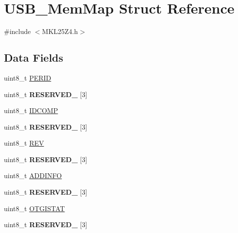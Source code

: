 \hypertarget{struct_u_s_b___mem_map}{}\section{U\+S\+B\+\_\+\+Mem\+Map Struct Reference}
\label{struct_u_s_b___mem_map}


{\ttfamily \#include $<$M\+K\+L25\+Z4.\+h$>$}

\subsection*{Data Fields}
\begin{DoxyCompactItemize}
\item 
uint8\+\_\+t \hyperlink{struct_u_s_b___mem_map_af90a61467080255b062e7a3ed7179e3a}{P\+E\+R\+I\+D}
\item 
\hypertarget{struct_u_s_b___mem_map_a6d02c9345b2d39c945c905d46077a0ec}{}uint8\+\_\+t {\bfseries R\+E\+S\+E\+R\+V\+E\+D\+\_} \mbox{[}3\mbox{]}\label{struct_u_s_b___mem_map_a6d02c9345b2d39c945c905d46077a0ec}

\item 
uint8\+\_\+t \hyperlink{struct_u_s_b___mem_map_a694d344ab54e43fa5ce23e1aeae4069a}{I\+D\+C\+O\+M\+P}
\item 
\hypertarget{struct_u_s_b___mem_map_a8920d7bfe319ce3f5af958ad4c8f2cca}{}uint8\+\_\+t {\bfseries R\+E\+S\+E\+R\+V\+E\+D\+\_} \mbox{[}3\mbox{]}\label{struct_u_s_b___mem_map_a8920d7bfe319ce3f5af958ad4c8f2cca}

\item 
uint8\+\_\+t \hyperlink{struct_u_s_b___mem_map_a95133aaa5ed5ba8a03154f5fe270b84a}{R\+E\+V}
\item 
\hypertarget{struct_u_s_b___mem_map_a76a9ec2331c09e8e213dfb169fbac870}{}uint8\+\_\+t {\bfseries R\+E\+S\+E\+R\+V\+E\+D\+\_} \mbox{[}3\mbox{]}\label{struct_u_s_b___mem_map_a76a9ec2331c09e8e213dfb169fbac870}

\item 
uint8\+\_\+t \hyperlink{struct_u_s_b___mem_map_aa53fb603c9949324b88be8514f856671}{A\+D\+D\+I\+N\+F\+O}
\item 
\hypertarget{struct_u_s_b___mem_map_a2a68f89086ca788e9123a2281decfe22}{}uint8\+\_\+t {\bfseries R\+E\+S\+E\+R\+V\+E\+D\+\_} \mbox{[}3\mbox{]}\label{struct_u_s_b___mem_map_a2a68f89086ca788e9123a2281decfe22}

\item 
uint8\+\_\+t \hyperlink{struct_u_s_b___mem_map_a418c1814b43ee98065383e8270708b5e}{O\+T\+G\+I\+S\+T\+A\+T}
\item 
\hypertarget{struct_u_s_b___mem_map_a22ca61cf43a11168ba32640820999621}{}uint8\+\_\+t {\bfseries R\+E\+S\+E\+R\+V\+E\+D\+\_} \mbox{[}3\mbox{]}\label{struct_u_s_b___mem_map_a22ca61cf43a11168ba32640820999621}


\end{DoxyCompactItemize}
